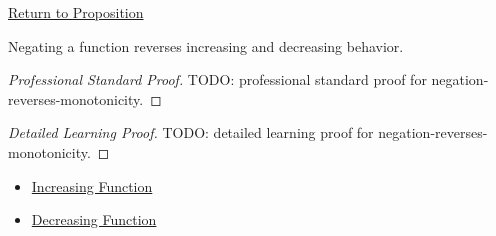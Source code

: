 \newpage
{}
\label{prf:negation-reverses-monotonicity}

\begin{remark*}[Return]
\hyperref[prop:negation-reverses-monotonicity]{Return to Proposition}
\end{remark*}

\begin{proposition*}
Negating a function reverses increasing and decreasing behavior.
\end{proposition*}

\begin{proof}[Professional Standard Proof]
\LRAProofBodyStart
TODO: professional standard proof for negation-reverses-monotonicity.
\end{proof}

\begin{proof}[Detailed Learning Proof]
\LRAProofBodyStart
TODO: detailed learning proof for negation-reverses-monotonicity.
\end{proof}

\begin{remark*}
\end{remark*}

\begin{dependencies}
\begin{itemize}
  \item \hyperref[def:function-increasing]{Increasing Function}
  \item \hyperref[def:function-decreasing]{Decreasing Function}
\end{itemize}
\end{dependencies}

\clearpage
